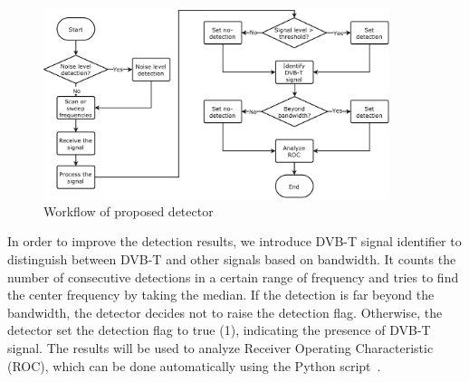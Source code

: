 \begin{figure}[h]
    \centering
    \includegraphics[width=0.9\textwidth]{figures/workflow}
    \caption{Workflow of proposed detector}
    \label{fig:workflow}
\end{figure}

In order to improve the detection results, we introduce DVB-T signal identifier to distinguish between DVB-T and other signals based on bandwidth. It counts the number of consecutive detections in a certain range of frequency and tries to find the center frequency by taking the median. If the detection is far beyond the bandwidth, the detector decides not to raise the detection flag. Otherwise, the detector set the detection flag to true (1), indicating the presence of DVB-T signal. The results will be used to analyze Receiver Operating Characteristic (ROC), which can be done automatically using the Python script~\cite{matplotlib2016,scipy.org2015,justinjohnson2016}.

